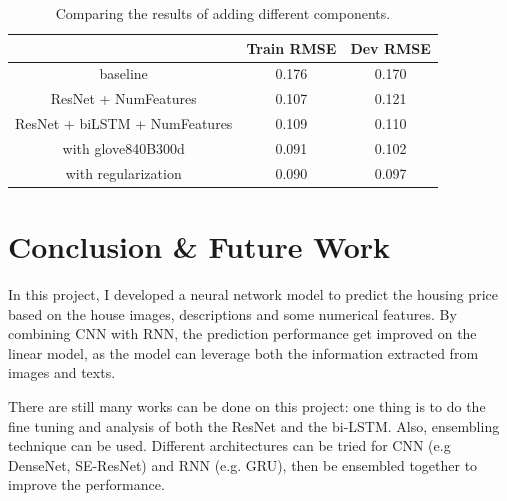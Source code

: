 \documentclass{article} %
\begin{document}
\begin{table}
	\label{sample-table2}
	\begin{center}
		\begin{tabular}{|c|cc|}
			\hline
			\multicolumn{1}{|c|}{}  &\multicolumn{1}{c}{\bf Train RMSE} &\multicolumn{1}{c|}{\bf Dev RMSE} \\ 
			\hline
			baseline                                                   &0.176 &0.170\\
			ResNet + NumFeatures           					&0.107 &0.121\\
			ResNet + biLSTM + NumFeatures           &0.109 &0.110\\	
			with glove840B300d             &0.091 &0.102\\
			with regularization             	&0.090 &0.097\\
			\hline
		\end{tabular}
	\end{center}
	\caption{Comparing the results of adding different components.}
\end{table}




\section{Conclusion \& Future Work}

In this project, I developed a neural network model to predict the housing price
based on the house images, descriptions and some numerical features.
By combining CNN with RNN, the prediction performance get improved on the linear model,
as the model can leverage both the information extracted from images and texts.

There are still many works can be done on this project:
one thing is to do the fine tuning and analysis of both the ResNet and the bi-LSTM. 
Also, ensembling technique can be used. Different architectures can be tried for CNN (e.g DenseNet, SE-ResNet) and RNN (e.g. GRU), then be ensembled together to improve the performance.


{\small
	
	
}
\end{document}

